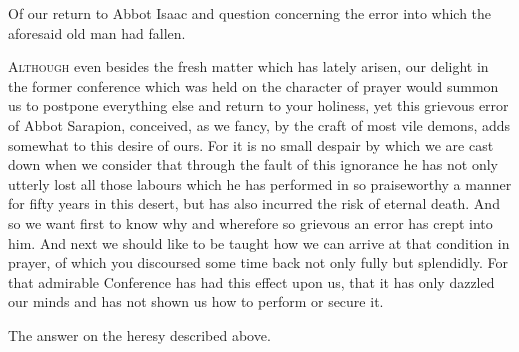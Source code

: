 
Of our return to Abbot Isaac and question concerning the error into which the aforesaid old man had fallen.

\textsc{Although} even besides the fresh matter which has lately arisen, our delight in the former conference which was held on the character of prayer would summon us to postpone everything else and return to your holiness, yet this grievous error of Abbot Sarapion, conceived, as we fancy, by the craft of most vile demons, adds somewhat to this desire of ours. For it is no small despair by which we are cast down when we consider that through the fault of this ignorance he has not only utterly lost all those labours which he has performed in so praiseworthy a manner for fifty years in this desert, but has also incurred the risk of eternal death. And so we want first to know why and wherefore so grievous an error has crept into him. And next we should like to be taught how we can arrive at that condition in prayer, of which you discoursed some time back not only fully but splendidly. For that admirable Conference has had this effect upon us, that it has only dazzled our minds and has not shown us how to perform or secure it.


The answer on the heresy described above.


